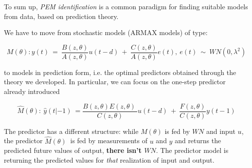 

To sum up, \textit{PEM identification} is a common paradigm for finding suitable models from data, based on prediction theory.

We have to move from stochastic models (ARMAX models) of type: 

$$
M(\theta):
y( t) \ =\ \frac{B( z,\theta )}{A( z,\theta )} u( t-d) \ +\ \frac{C( z,\theta )}{A( z,\theta )} e( t) ,\ e( t) \ \sim \ WN\left( 0,\lambda ^{2}\right)
$$

to models in prediction form, i.e. the optimal predictors obtained through the theory we developed. In particular, we can focus on the one-step predictor already introduced

$$
\hat{M}( \theta ) :
\ \hat{y}( t|-1) \ =\frac{B( z,\theta ) E( z,\theta ) \ }{C( z,\theta )} u( t-d) \ +\ \frac{F( z,\theta )}{C( z,\theta )} y( t-1)
$$

The predictor has a different structure: while $ M( \theta )$ is fed by $ WN$ and input $ u$, the predictor $ \hat{M}( \theta ) \ $ is fed by measurements of $ u$ and $ y$ and returns the predicted future values of output, \textbf{there isn't $ WN$}. The predictor model is returning the predicted values for \textit{that} realization of input and output.



